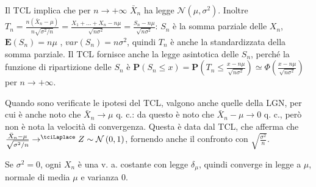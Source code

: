 \documentclass{article}
\begin{document}
Il TCL implica che per $n\rightarrow +\infty $ $\bar{X}_{n}$ ha legge $%
\mathcal{N}\left( \mu ,\sigma ^{2}\right) $. Inoltre $T_{n}=\frac{n\left( 
\bar{X}_{n}-\mu \right) }{n\sqrt{\sigma ^{2}/n}}=\frac{X_{1}+...+X_{n}-n\mu 
}{\sqrt{n\sigma ^{2}}}=\frac{S_{n}-n\mu }{\sqrt{n\sigma ^{2}}}$: $S_{n}$ 
\`{e} la somma parziale delle $X_{n}$, $\mathbf{E}\left( S_{n}\right) =n\mu $%
, $var\left( S_{n}\right) =n\sigma ^{2}$, quindi $T_{n}$ \`{e} anche la
standardizzata della somma parziale. Il TCL fornisce anche la legge
asintotica delle $S_{n}$, perch\'{e} la funzione di ripartizione delle $%
S_{n} $ \`{e} $\mathbf{P}\left( S_{n}\leq x\right) =\mathbf{P}\left(
T_{n}\leq \frac{x-n\mu }{\sqrt{n\sigma ^{2}}}\right) \simeq \Phi \left( 
\frac{x-n\mu }{\sqrt{n\sigma ^{2}}}\right) $ per $n\rightarrow +\infty $.

Quando sono verificate le ipotesi del TCL, valgono anche quelle della LGN,
per cui \`{e} anche noto che $\bar{X}_{n}\rightarrow \mu $ q. c.: da questo 
\`{e} noto che $\bar{X}_{n}-\mu \rightarrow 0$ q. c., per\`{o} non \`{e}
nota la velocit\`{a} di convergenza. Questa \`{e} data dal TCL, che afferma
che $\frac{\bar{X}_{n}-\mu }{\sqrt{\sigma ^{2}/n}}\rightarrow ^{\tciLaplace
}Z\sim \mathcal{N}\left( 0,1\right) $, fornendo anche il confronto con $%
\sqrt{\frac{\sigma ^{2}}{n}}$.

Se $\sigma ^{2}=0$, ogni $X_{n}$ \`{e} una v. a. costante con legge $\delta
_{\mu }$, quindi converge in legge a $\mu $, normale di media $\mu $ e
varianza $0$.
\end{document}
